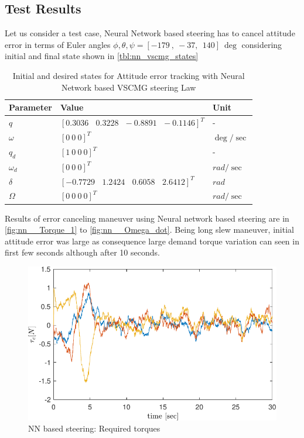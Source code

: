 \subsection{Test Results}
Let us consider a test case, Neural Network based steering has to cancel attitude error in terms of Euler angles $\displaystyle \phi ,\theta ,\psi =[ -179\ ,\ -37,\ \ 140] \ \deg$ considering initial and final state shown in \autoref{tbl:nn_vscmg_states}
\begin{table}[H]
        \centering
        
\begin{tabular}{p{}|p{}|p{}}
\toprule 
 Parameter & Value & Unit \\
\midrule 
 $\displaystyle q$ & $\displaystyle [ 0.3036\ \ \ \ 0.3228\ \ \ -0.8891\ \ \ -0.1146]^{T}$ & - \\
\hline 
 $\displaystyle \omega $ & $\displaystyle [ 0\ 0\ 0]^{T}$ & $\displaystyle \deg /\sec$ \\
\hline 
 $\displaystyle q_{d}$ & $\displaystyle [ 1\ 0\ 0\ 0]^{T}$ & - \\
\hline 
 $\displaystyle \omega _{d}$ & $\displaystyle [ 0\ 0\ 0]^{T}$ & $\displaystyle rad/\sec$ \\
\hline 
 $\displaystyle \delta $ & $\displaystyle [ -0.7729\ \ \ \ 1.2424\ \ \ \ 0.6058\ \ \ \ 2.6412]^{T}$ & $\displaystyle rad$ \\
\hline 
 $\displaystyle \Omega $ & $\displaystyle [ 0\ 0\ 0\ 0]^{T}$ & $\displaystyle rad/\sec$ \\
 \bottomrule
\end{tabular}
        \caption{Initial and desired states for Attitude error tracking with Neural Network based VSCMG steering Law }
        \label{tbl:nn_vscmg_states}
        \end{table}
\noindent Results of error canceling maneuver using Neural network based steering are in \autoref{fig:nn__Torque_1} to \autoref{fig:nn__Omega_dot}. Being long slew maneuver, initial attitude error was large as consequence large demand torque variation can seen in first few seconds although after 10 seconds.
\begin{figure}[H]
    \centering
    \includegraphics[width=\textwidth]{figures/plots/RL/nn_Torque.pdf}
    \caption{NN based steering: Required torques}
    \label{fig:nn__Torque_1}
\end{figure}
